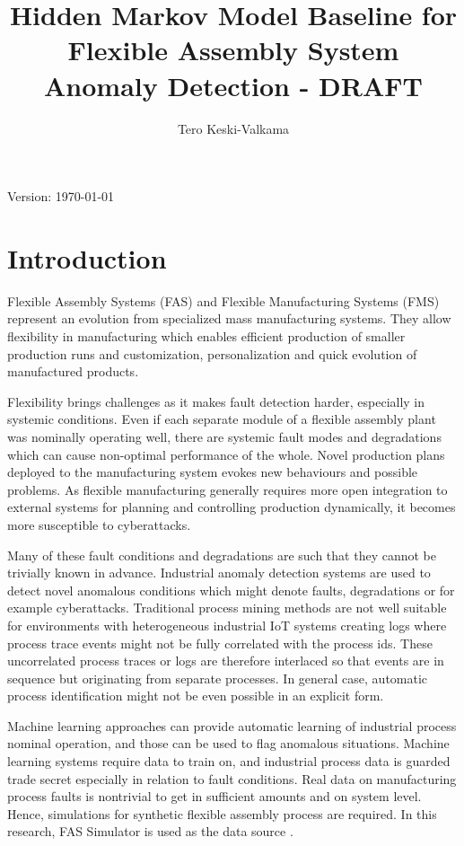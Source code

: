 \documentclass[journal]{IEEEtran}
\title{Hidden Markov Model Baseline for Flexible Assembly System Anomaly Detection - DRAFT}
\author{Tero Keski-Valkama}
\begin{document}
\maketitle
Version: \today

\begin{abstract}

\end{abstract}

\begin{IEEEkeywords}
\end{IEEEkeywords}

\section{Introduction}

Flexible Assembly Systems (FAS) and Flexible Manufacturing Systems (FMS) represent an evolution from specialized mass manufacturing systems. They allow flexibility in manufacturing which enables efficient production of smaller production runs and customization, personalization and quick evolution of manufactured products.

Flexibility brings challenges as it makes fault detection harder, especially in systemic conditions. Even if each separate module of a flexible assembly plant was nominally operating well, there are systemic fault modes and degradations which can cause non-optimal performance of the whole. Novel production plans deployed to the manufacturing system evokes new behaviours and possible problems. As flexible manufacturing generally requires more open integration to external systems for planning and controlling production dynamically, it becomes more susceptible to cyberattacks.

Many of these fault conditions and degradations are such that they cannot be trivially known in advance. Industrial anomaly detection systems are used to detect novel anomalous conditions which might denote faults, degradations or for example cyberattacks. Traditional process mining methods are not well suitable for environments with heterogeneous industrial IoT systems creating logs where process trace events might not be fully correlated with the process ids. These uncorrelated process traces or logs are therefore interlaced so that events are in sequence but originating from separate processes. In general case, automatic process identification might not be even possible in an explicit form.

Machine learning approaches can provide automatic learning of industrial process nominal operation, and those can be used to flag anomalous situations. Machine learning systems require data to train on, and industrial process data is guarded trade secret especially in relation to fault conditions. Real data on manufacturing process faults is nontrivial to get in sufficient amounts and on system level. Hence, simulations for synthetic flexible assembly process are required. In this research, FAS Simulator is used as the data source \cite{keski2017simulator}.
\end{document}

